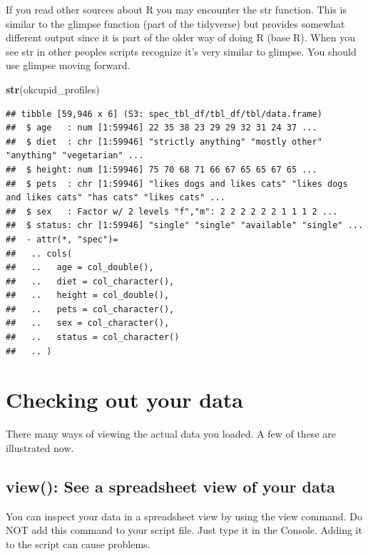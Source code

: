 \documentclass[
]{krantz}
\makeatletter
\newenvironment{Shaded}{\begin{snugshade}}{\end{snugshade}}
\newcommand{\KeywordTok}[1]{\textcolor[rgb]{0.27,0.27,0.27}{\textbf{#1}}}
\newcommand{\NormalTok}[1]{#1}
\newenvironment{kframe}{%
\medskip{}
\setlength{\fboxsep}{.8em}
 \def\at@end@of@kframe{}%
 \ifinner\ifhmode%
  \def\at@end@of@kframe{\end{minipage}}%
  \begin{minipage}{\columnwidth}%
 \fi\fi%
 \def\FrameCommand##1{\hskip\@totalleftmargin \hskip-\fboxsep
 \colorbox{shadecolor}{##1}\hskip-\fboxsep
     \hskip-\linewidth \hskip-\@totalleftmargin \hskip\columnwidth}%
 \MakeFramed {\advance\hsize-\width
   \@totalleftmargin\z@ \linewidth\hsize
   \@setminipage}}%
 {\par\unskip\endMakeFramed%
 \at@end@of@kframe}
\renewenvironment{Shaded}{\begin{kframe}}{\end{kframe}}
\makeatother
\begin{document}
If you read other sources about R you may encounter the str function. This is similar to the glimpse function (part of the tidyverse) but provides somewhat different output since it is part of the older way of doing R (base R). When you see str in other peoples scripts recognize it's very similar to glimpse. You should use glimpse moving forward.

\begin{Shaded}
\begin{Highlighting}[]
\KeywordTok{str}\NormalTok{(okcupid_profiles)}
\end{Highlighting}
\end{Shaded}

\begin{verbatim}
## tibble [59,946 x 6] (S3: spec_tbl_df/tbl_df/tbl/data.frame)
##  $ age   : num [1:59946] 22 35 38 23 29 29 32 31 24 37 ...
##  $ diet  : chr [1:59946] "strictly anything" "mostly other" "anything" "vegetarian" ...
##  $ height: num [1:59946] 75 70 68 71 66 67 65 65 67 65 ...
##  $ pets  : chr [1:59946] "likes dogs and likes cats" "likes dogs and likes cats" "has cats" "likes cats" ...
##  $ sex   : Factor w/ 2 levels "f","m": 2 2 2 2 2 2 1 1 1 2 ...
##  $ status: chr [1:59946] "single" "single" "available" "single" ...
##  - attr(*, "spec")=
##   .. cols(
##   ..   age = col_double(),
##   ..   diet = col_character(),
##   ..   height = col_double(),
##   ..   pets = col_character(),
##   ..   sex = col_character(),
##   ..   status = col_character()
##   .. )
\end{verbatim}

\hypertarget{checking-out-your-data}{%
\section{Checking out your data}\label{checking-out-your-data}}

There many ways of viewing the actual data you loaded. A few of these are illustrated now.

\hypertarget{view-see-a-spreadsheet-view-of-your-data}{%
\subsection{view(): See a spreadsheet view of your data}\label{view-see-a-spreadsheet-view-of-your-data}}

You can inspect your data in a spreadsheet view by using the view command. Do NOT add this command to your script file. Just type it in the Console. Adding it to the script can cause problems.
\end{document}
